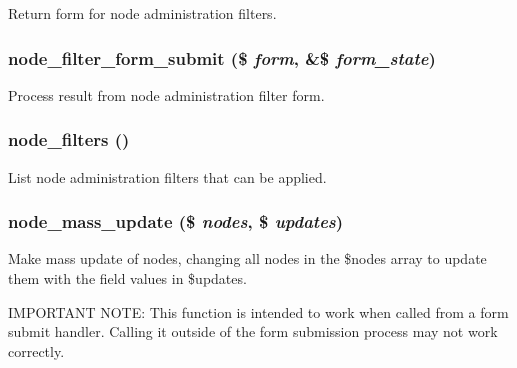 Return form for node administration filters. \hypertarget{node_8admin_8inc_346f00ebb9b4aae36025623d893c5061}{
\subsubsection[{node\_\-filter\_\-form\_\-submit}]{\setlength{\rightskip}{0pt plus 5cm}node\_\-filter\_\-form\_\-submit (\$ {\em form}, \/  \&\$ {\em form\_\-state})}}
\label{node_8admin_8inc_346f00ebb9b4aae36025623d893c5061}


Process result from node administration filter form. \hypertarget{node_8admin_8inc_a9c4e0dc2b5e8a9ca9c855161ca02969}{
\subsubsection[{node\_\-filters}]{\setlength{\rightskip}{0pt plus 5cm}node\_\-filters ()}}
\label{node_8admin_8inc_a9c4e0dc2b5e8a9ca9c855161ca02969}


List node administration filters that can be applied. \hypertarget{node_8admin_8inc_b40a38d08f170c418b0dac544d8ba97c}{
\subsubsection[{node\_\-mass\_\-update}]{\setlength{\rightskip}{0pt plus 5cm}node\_\-mass\_\-update (\$ {\em nodes}, \/  \$ {\em updates})}}
\label{node_8admin_8inc_b40a38d08f170c418b0dac544d8ba97c}


Make mass update of nodes, changing all nodes in the \$nodes array to update them with the field values in \$updates.

IMPORTANT NOTE: This function is intended to work when called from a form submit handler. Calling it outside of the form submission process may not work correctly.


